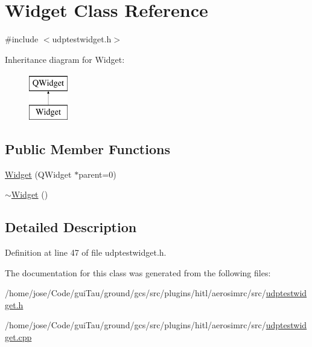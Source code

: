\hypertarget{class_widget}{\section{Widget Class Reference}
\label{class_widget}
}


{\ttfamily \#include $<$udptestwidget.\-h$>$}

Inheritance diagram for Widget\-:\begin{figure}[H]
\begin{center}
\leavevmode
\includegraphics[height=2.000000cm]{class_widget}
\end{center}
\end{figure}
\subsection*{Public Member Functions}
\begin{DoxyCompactItemize}
\item 
\hyperlink{group___aero_sim_r_c_ga29531c7f141e461322981b3b579d4590}{Widget} (Q\-Widget $\ast$parent=0)
\item 
\hyperlink{group___aero_sim_r_c_gaa24f66bcbaaec6d458b0980e8c8eae65}{$\sim$\-Widget} ()
\end{DoxyCompactItemize}


\subsection{Detailed Description}


Definition at line 47 of file udptestwidget.\-h.



The documentation for this class was generated from the following files\-:\begin{DoxyCompactItemize}
\item 
/home/jose/\-Code/gui\-Tau/ground/gcs/src/plugins/hitl/aerosimrc/src/\hyperlink{udptestwidget_8h}{udptestwidget.\-h}\item 
/home/jose/\-Code/gui\-Tau/ground/gcs/src/plugins/hitl/aerosimrc/src/\hyperlink{udptestwidget_8cpp}{udptestwidget.\-cpp}\end{DoxyCompactItemize}
